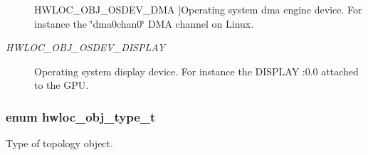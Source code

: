 \begin{Desc}
\begin{description}
{\hypertarget{a00041_gga64f5d539df299c97ae80ce53fc4b56c0a827ad1643360711a8b6c6af671366791}{
HWLOC\_\-OBJ\_\-OSDEV\_\-DMA}
\label{a00041_gga64f5d539df299c97ae80ce53fc4b56c0a827ad1643360711a8b6c6af671366791}
}]Operating system dma engine device. For instance the \char`\"{}dma0chan0\char`\"{} DMA channel on Linux. \item[{\em 
\hypertarget{a00041_gga64f5d539df299c97ae80ce53fc4b56c0a5da1cc266d3d288fdc639b0e800e9da4}{
HWLOC\_\-OBJ\_\-OSDEV\_\-DISPLAY}
\label{a00041_gga64f5d539df299c97ae80ce53fc4b56c0a5da1cc266d3d288fdc639b0e800e9da4}
}]Operating system display device. For instance the DISPLAY :0.0 attached to the GPU. \end{description}
\end{Desc}

\hypertarget{a00041_gacd37bb612667dc437d66bfb175a8dc55}{
\subsubsection[{hwloc\_\-obj\_\-type\_\-t}]{\setlength{\rightskip}{0pt plus 5cm}enum {\bf hwloc\_\-obj\_\-type\_\-t}}}
\label{a00041_gacd37bb612667dc437d66bfb175a8dc55}


Type of topology object. 

